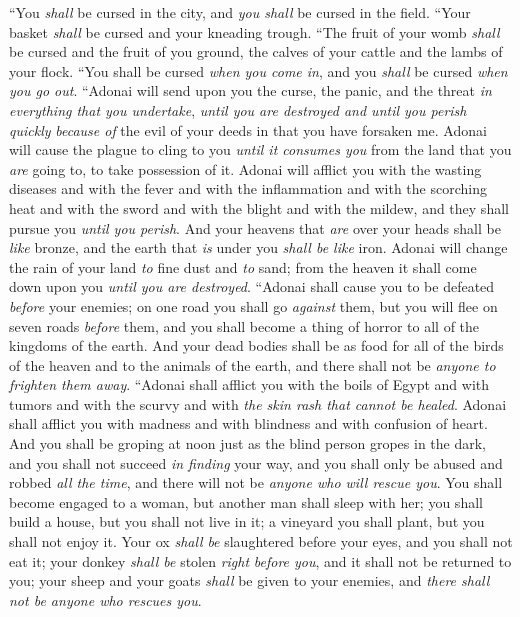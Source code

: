 \begin{biblechapter}
\verse “You \textit{shall} be cursed in the city, and \textit{you shall} be cursed in the field.
\verse “Your basket \textit{shall} be cursed and your kneading trough.
\verse “The fruit of your womb \textit{shall} be cursed and the fruit of you ground, the calves of your cattle and the lambs of your flock.
\verse “You shall be cursed \textit{when you come in}, and you \textit{shall} be cursed \textit{when you go out}.
\verse “Adonai will send upon you the curse, the panic, and the threat \textit{in everything that you undertake}, \textit{until you are destroyed and until you perish quickly} \textit{because of} the evil of your deeds in that you have forsaken me.
\verse Adonai will cause the plague to cling to you \textit{until it consumes you} from the land that you \textit{are} going to, to take possession of it.
\verse Adonai will afflict you with the wasting diseases and with the fever and with the inflammation and with the scorching heat and with the sword and with the blight and with the mildew, and they shall pursue you \textit{until you perish}.
\verse And your heavens that \textit{are} over your heads shall be \textit{like} bronze, and the earth that \textit{is} under you \textit{shall be like} iron.
\verse Adonai will change the rain of your land \textit{to} fine dust and \textit{to} sand; from the heaven it shall come down upon you \textit{until you are destroyed}.
\verse “Adonai shall cause you to be defeated \textit{before} your enemies; on one road you shall go \textit{against} them, but you will flee on seven roads \textit{before} them, and you shall become a thing of horror to all of the kingdoms of the earth.
\verse And your dead bodies shall be as food for all of the birds of the heaven and to the animals of the earth, and there shall not be \textit{anyone to frighten them away}.
\verse “Adonai shall afflict you with the boils of Egypt and with tumors and with the scurvy and with \textit{the skin rash that cannot be healed}.
\verse Adonai shall afflict you with madness and with blindness and with confusion of heart.
\verse And you shall be groping at noon just as the blind person gropes in the dark, and you shall not succeed \textit{in finding} your way, and you shall only be abused and robbed \textit{all the time}, and there will not be \textit{anyone who will rescue you}. 
\verse You shall become engaged to a woman, but another man shall sleep with her; you shall build a house, but you shall not live in it; a vineyard you shall plant, but you shall not enjoy it.
\verse Your ox \textit{shall} \textit{be} slaughtered before your eyes, and you shall not eat it; your donkey \textit{shall be} stolen \textit{right} \textit{before you}, and it shall not be returned to you; your sheep and your goats \textit{shall} be given to your enemies, and \textit{there shall not be anyone who rescues you}.

\end{biblechapter}

